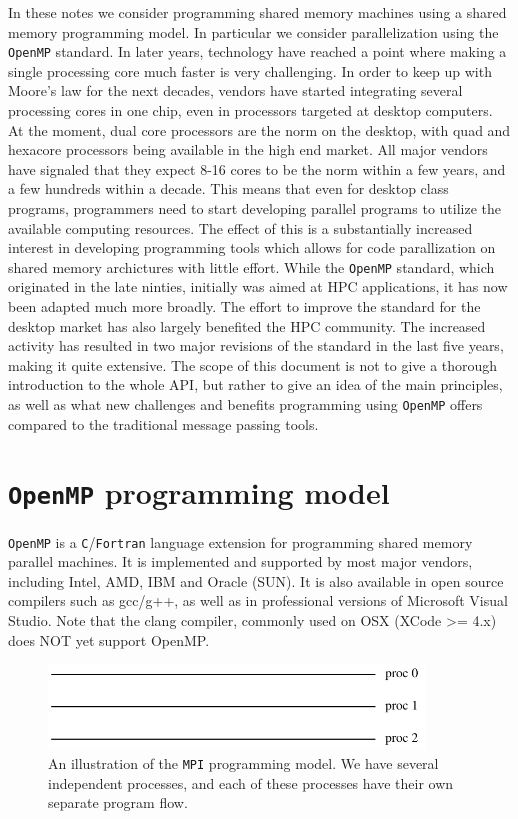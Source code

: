 \documentclass[twoside, 11pt, a4paper]{article}
\begin{document}
In these notes we consider programming shared memory machines using a shared memory programming model.
In particular we consider parallelization using the \texttt{OpenMP} standard.
In later years, technology have reached a point where making a single processing core 
much faster is very challenging. In order to keep 
up with Moore's law for the next decades, vendors have started integrating several 
processing cores in one chip, even in processors targeted at desktop computers.
At the moment, dual core processors are the norm on the desktop, with quad and
hexacore processors being available in the high end market. All major vendors
have signaled that they expect 8-16 cores to be the norm within a few years, and
a few hundreds within a decade.
This means that even for desktop class programs, programmers need to start developing parallel
programs to utilize the available computing resources. The effect of this is a
substantially increased interest in developing programming tools 
which allows for code parallization on shared memory archictures with little effort.
While the \texttt{OpenMP} standard, which originated in the late ninties, initially was
aimed at HPC applications, it has now been adapted much more broadly. 
The effort to improve the standard for the desktop market has also largely benefited the 
HPC community. The increased activity has resulted in two major revisions of the standard 
in the last five years, making it quite extensive. The scope of this document is not to give 
a thorough introduction to the whole API, but rather to give an idea of the main principles,
as well as what new challenges and benefits programming using \texttt{OpenMP} offers compared to the
traditional message passing tools.
\newpage
\section{\texttt{OpenMP} programming model}
\texttt{OpenMP} is a \texttt{C}/\texttt{Fortran} language extension for programming shared memory parallel machines.
It is implemented and supported by most major vendors, including Intel, AMD, IBM and Oracle (SUN).
It is also available in open source compilers such as gcc/g++, as well as in professional versions of Microsoft Visual Studio.
Note that the clang compiler, commonly used on OSX (XCode >= 4.x) does NOT yet support OpenMP.

\begin{figure}[ht]
	\begin{center}
		\includegraphics[width=10cm]{mpi}
	\end{center}
	\caption{An illustration of the \texttt{MPI} programming model. We have several independent
			 processes, and each of these processes have their own separate program flow.}
	\label{fig:mpi}
\end{figure}
\end{document}
